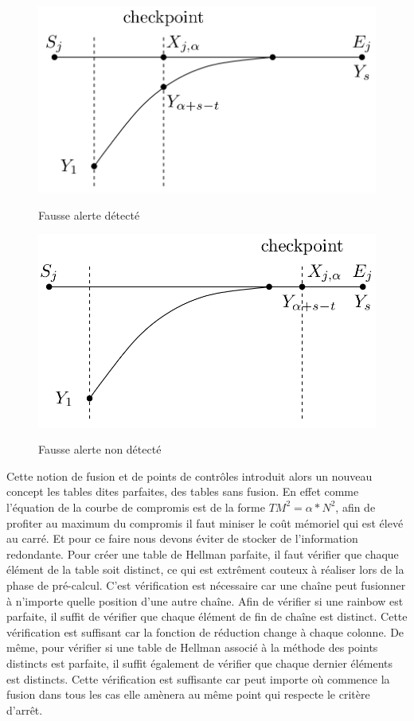 \begin{figure}[h!]
	\begin{minipage}{.5\textwidth}
		\includegraphics[width=0.9\linewidth]{other/FalseAlarmDetected.png}
		\caption{}{Fausse alerte détecté}
	\end{minipage}
	\begin{minipage}{.5\textwidth}
	    \includegraphics[width=0.9\linewidth]{other/FalseAlarmNotDetected.png}
		\caption{}{Fausse alerte non détecté}
  	\end{minipage}
\end{figure}


	Cette notion de fusion et de points de contrôles introduit alors un nouveau concept les tables dites parfaites, des tables sans fusion. En effet comme l'équation de la courbe de compromis est de la forme $TM^2=\alpha *N^2$, afin de profiter au maximum du compromis il faut miniser le coût mémoriel qui est élevé au carré. Et pour ce faire nous devons éviter de stocker de l'information redondante.
	\bigskip
	Pour créer une table de Hellman parfaite, il faut vérifier que chaque élément de la table soit distinct, ce qui est extrêment couteux à réaliser lors de la phase de pré-calcul. C'est vérification est nécessaire car une chaîne peut fusionner à n'importe quelle position d'une autre chaîne.
	\bigskip
	Afin de vérifier si une \gls{rainbow} est parfaite, il suffit de vérifier que chaque élément de fin de chaîne est distinct. Cette vérification est suffisant car la fonction de réduction change à chaque colonne.
	\bigskip
	De même, pour vérifier si une table de Hellman associé à la méthode des points distincts est parfaite, il suffit également de vérifier que chaque dernier éléments est distincts. Cette vérification est suffisante car peut importe où commence la fusion dans tous les cas elle amènera au même point qui respecte le critère d'arrêt.

